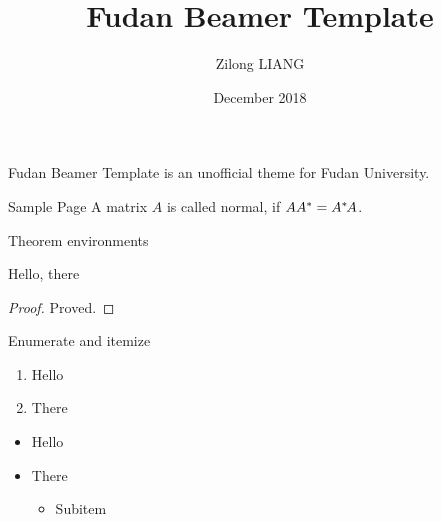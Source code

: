 \documentclass{beamer}
\title{Fudan Beamer Template}
\author{Zilong LIANG}
\institute{School of Mathematical Sciences\\Fudan University}
\date{December 2018}
\begin{document}
  
  \begin{frame}
    \maketitle
  \end{frame}

  \begin{frame}
    \alert{Fudan Beamer Template} is an unofficial theme for Fudan University.
  \end{frame}

  \begin{frame}{Sample Page}
    A matrix $A$ is called normal, if $AA^*=A^*\mskip-2muA$.
  \end{frame}

  \begin{frame}{Theorem environments}
    \begin{theorem}
      Hello, there
    \end{theorem}
    \begin{proof}
      Proved.
    \end{proof}
  \end{frame}

  \begin{frame}{Enumerate and itemize}
    \begin{enumerate}
      \item Hello
      \item There
    \end{enumerate}
    \begin{itemize}
      \item Hello
      \item There
      \begin{itemize}
        \item Subitem
      \end{itemize}
    \end{itemize}
  \end{frame}

  \begin{frame}
    \itshape\lipsum[3]
  \end{frame}
\end{document}
